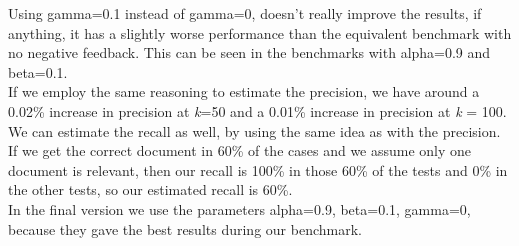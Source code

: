 \documentclass{article}
\begin{document}
Using gamma=0.1 instead of gamma=0, doesn't really improve the results, if anything, it has a slightly worse performance than the equivalent benchmark with no negative feedback. This can be seen in the benchmarks with alpha=0.9 and beta=0.1.\\ 

If we employ the same reasoning to estimate the precision, we have around a 0.02\% increase in precision at \textit{k}=50 and a 0.01\% increase in precision at \textit{k} = 100. We can estimate the recall as well, by using the same idea as with the precision. If we get the correct document in 60\% of the cases and we assume only one document is relevant, then our recall is 100\% in those 60\% of the tests and 0\% in the other tests, so our estimated recall is  60\%.\\

In the final version we use the parameters alpha=0.9, beta=0.1, gamma=0, because they gave the best results during our benchmark.\\  
\end{document}
